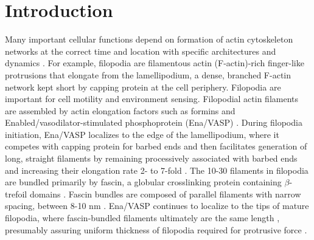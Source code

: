 \section{Introduction}\label{ch02-introduction}
Many important cellular functions depend on formation of actin cytoskeleton networks at the correct time and location with specific architectures and dynamics \citep{pollard_actin_2009,campellone_nucleator_2010}. For example, filopodia are filamentous actin (F-actin)-rich finger-like protrusions that elongate from the lamellipodium, a dense, branched F-actin network kept short by capping protein \citep{pollard_cellular_2003} at the cell periphery. Filopodia are important for cell motility and environment sensing. Filopodial actin filaments are assembled by actin elongation factors such as formins and Enabled/vasodilator-stimulated phosphoprotein (Ena/VASP) \citep{mattila_filopodia:_2008}. During filopodia initiation, Ena/VASP localizes to the edge of the lamellipodium, where it competes with capping protein for barbed ends \citep{bear_antagonism_2002, svitkina_mechanism_2003, barzik_ena/vasp_2005, applewhite_ena/vasp_2007, bear_ena/vasp:_2009, winkelman_ena/vasp_2014} and then facilitates generation of long, straight filaments by remaining processively associated with barbed ends and increasing their elongation rate 2- to 7-fold \citep{breitsprecher_clustering_2008,breitsprecher_molecular_2011,pasic_ena/vasp_2008,hansen_vasp_2010,winkelman_ena/vasp_2014,bruhmann_distinct_2017}. The 10-30 filaments in filopodia are bundled primarily by fascin, a globular crosslinking protein containing $\beta$-trefoil domains \citep{vignjevic_role_2006,jansen_mechanism_2011}. Fascin bundles are composed of parallel filaments with narrow spacing, between 8-10 nm \citep{cant_drosophila_1994,edwards_fascins_1995,jansen_mechanism_2011,yang_molecular_2013}. Ena/VASP continues to localize to the tips of mature filopodia, where fascin-bundled filaments ultimately are the same length \citep{faix_making_2006,gupton_filopodia:_2007}, presumably assuring uniform thickness of filopodia required for protrusive force \citep{svitkina_mechanism_2003,winkelman_ena/vasp_2014}.

